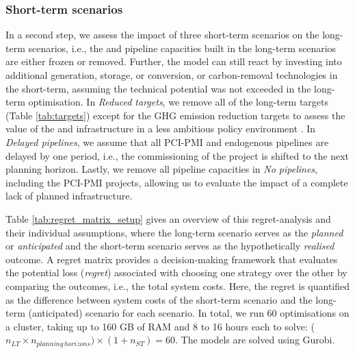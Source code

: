 \documentclass[preprint,12pt,sort&compress]{elsarticle}
\begin{document}
\subsubsection{Short-term scenarios}
\label{sec:short-term_scenarios}
In a second step, we assess the impact of three short-term scenarios on the long-term scenarios, i.e., the  and  pipeline capacities built in the long-term scenarios are either frozen or removed. Further, the model can still react by investing into additional generation, storage, or conversion, or carbon-removal technologies in the short-term, assuming the technical potential was not exceeded in the long-term optimisation. In \textit{Reduced targets}, we remove all of the long-term targets (Table \ref{tab:targets}) except for the GHG emission reduction targets to assess the value of the  and  infrastructure in a less ambitious policy environment \cite{europeancourtofauditorsEUsIndustrialPolicy2024}. In \textit{Delayed pipelines}, we assume that all PCI-PMI and endogenous pipelines are delayed by one period, i.e., the commissioning of the project is shifted to the next planning horizon. Lastly, we remove all pipeline capacities in \textit{No pipelines}, including the PCI-PMI projects, allowing us to evaluate the impact of a complete lack of planned infrastructure. 

Table \ref{tab:regret_matrix_setup} gives an overview of this regret-analysis and their individual assumptions, where the long-term scenario serves as the \textit{planned} or \textit{anticipated} and the short-term scenario serves as the hypothetically \textit{realised} outcome. A regret matrix provides a decision-making framework that evaluates the potential loss (\textit{regret}) associated with choosing one strategy over the other by comparing the outcomes, i.e., the total system costs. Here, the regret is quantified as the difference between system costs of the short-term scenario and the long-term (anticipated) scenario for each scenario. 
In total, we run 60 optimisations on a cluster, taking up to 160 GB of RAM and 8 to 16 hours each to solve: ($n_{LT} \times n_{planning\,horizons}) \times (1+n_{ST}) = 60$. The models are solved using Gurobi.
\end{document}
